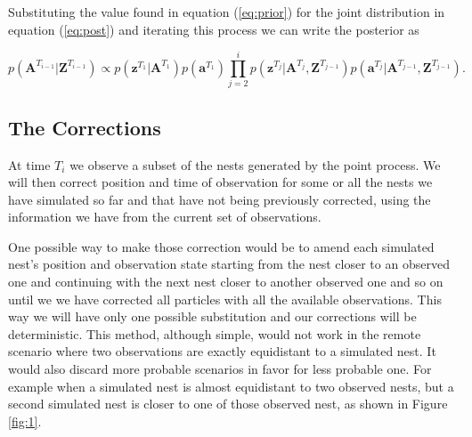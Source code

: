 \documentclass[11pt,a4paper]{article}
\renewcommand{\vec}[1]{\mathbf{#1}}
\begin{document}
{{Substituting the value found in equation (\ref{eq:prior}) for the joint distribution in equation (\ref{eq:post}) and iterating this process we can write the posterior as

\begin{equation} \label{eq:post2}
    p(\vec{A}^{T_{i-1}} | \vec{Z}^{T_{i-1}}) \propto p(\vec{z}^{T_1} | \vec{A}^{T_1}) p(\vec{a}^{T_1}) \prod_{j=2}^i p(\vec{z}^{T_j} | \vec{A}^{T_j}, \vec{Z}^{T_{j-1}}) p(\vec{a}^{T_j} | \vec{A}^{T_{j-1}}, \vec{Z}^{T_{j-1}}).
\end{equation}

}

{\color{red}
\subsection{The Corrections} \label{subsec:corrections}

At time $T_i$ we observe a subset of the nests generated by the point process. We will then correct position and time of observation for some or all the nests we have simulated so far and that have not being previously corrected, using the information we have from the current set of observations.

One possible way to make those correction would be to amend each simulated nest's position and observation state starting from the nest closer to an observed one and continuing with the next nest closer to another observed one and so on until we we have corrected all particles with all the available observations. This way we will have only one possible substitution and our corrections will be deterministic. This method, although simple, would not work in the remote scenario where two observations are exactly equidistant to a simulated nest. It would also discard more probable scenarios in favor for less probable one. For example when a simulated nest is almost equidistant to two observed nests, but a second simulated nest is closer to one of those observed nest, as shown in Figure \ref{fig:1}.

}}
\end{document}
